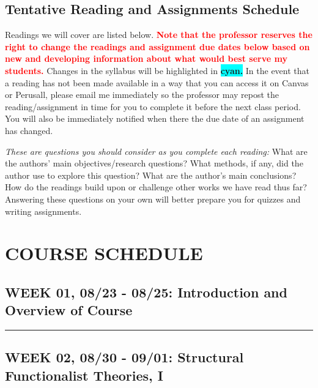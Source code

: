 \documentclass[11pt,]{article}
\begin{document}
\hypertarget{tentative-reading-and-assignments-schedule}{%
\subsection{Tentative Reading and Assignments
Schedule}\label{tentative-reading-and-assignments-schedule}}

Readings we will cover are listed below.
\textcolor{red}{\bf{Note that the professor reserves the right to change the readings and assignment due dates below based on new and developing information about what would best serve my students.}}
Changes in the syllabus will be highlighted in
\colorbox{Cyan}{\bf{cyan.}} In the event that a reading has not been
made available in a way that you can access it on Canvas or Perusall,
please email me immediately so the professor may repost the
reading/assignment in time for you to complete it before the next class
period. You will also be immediately notified when there the due date of
an assignment has changed.

\emph{These are questions you should consider as you complete each
reading:} What are the authors' main objectives/research questions? What
methods, if any, did the author use to explore this question? What are
the author's main conclusions? How do the readings build upon or
challenge other works we have read thus far? Answering these questions
on your own will better prepare you for quizzes and writing assignments.

\hypertarget{course-schedule}{%
\section{COURSE SCHEDULE}\label{course-schedule}}

\hypertarget{week-01-0823---0825-introduction-and-overview-of-course}{%
\subsection{WEEK 01, 08/23 - 08/25: Introduction and Overview of
Course}\label{week-01-0823---0825-introduction-and-overview-of-course}}

\bigbreak
\hrule

\hypertarget{week-02-0830---0901-structural-functionalist-theories-i}{%
\subsection{WEEK 02, 08/30 - 09/01: Structural Functionalist Theories,
I}\label{week-02-0830---0901-structural-functionalist-theories-i}}
\end{document}
